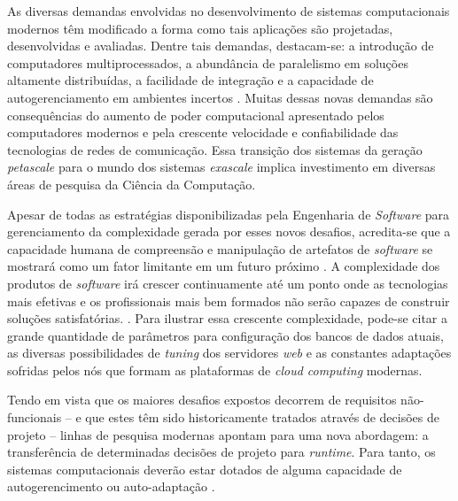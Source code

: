 \documentclass[conference]{IEEEtran}
\begin{document}
As diversas demandas envolvidas no desenvolvimento de sistemas computacionais modernos têm modificado a forma como tais aplicações são projetadas, desenvolvidas e avaliadas. Dentre tais demandas, destacam-se: a introdução de computadores multiprocessados, a abundância de paralelismo em soluções altamente distribuídas, a facilidade de integração e a capacidade de autogerenciamento em ambientes incertos \cite{DBLP:journals/ijhpca/Heroux09,DBLP:conf/icse/Northrop13,Gamell:2014:EAO:2683593.2683691}. Muitas dessas novas demandas são consequências do aumento de poder computacional apresentado pelos computadores modernos e pela crescente velocidade e confiabilidade das tecnologias de redes de comunicação. Essa transição dos sistemas da geração \textit{petascale} para o mundo dos sistemas \textit{exascale} \cite{DBLP:conf/ipps/Yelick08} implica investimento em diversas áreas de pesquisa da Ciência da Computação.

Apesar de todas as estratégias disponibilizadas pela Engenharia de \textit{Software} para gerenciamento da complexidade gerada por esses novos desafios, acredita-se que a capacidade humana de compreensão e manipulação de artefatos de \textit{software} se mostrará como um fator limitante em um futuro próximo \cite{DBLP:journals/csur/HuebscherM08}. A complexidade dos produtos de \textit{software} irá crescer continuamente até um ponto onde as tecnologias mais efetivas e os profissionais mais bem formados não serão capazes de construir soluções satisfatórias. \cite{DBLP:journals/computer/KephartC03}. Para ilustrar essa crescente complexidade, pode-se citar a grande quantidade de parâmetros para configuração dos bancos de dados atuais, as diversas possibilidades de \textit{tuning} dos servidores \textit{web} e as constantes adaptações sofridas pelos nós que formam as plataformas de \textit{cloud computing} modernas.

Tendo em vista que os maiores desafios expostos decorrem de requisitos não-funcionais -- e que estes têm sido historicamente tratados através de decisões de projeto -- linhas de pesquisa modernas apontam para uma nova abordagem: a transferência de determinadas decisões de projeto para \textit{runtime}. Para tanto, os sistemas computacionais deverão estar dotados de alguma capacidade de autogerencimento ou auto-adaptação \cite{DBLP:journals/csur/HuebscherM08,DBLP:journals/computer/KephartC03,DBLP:journals/taas/SalehieT09}.
\end{document}
